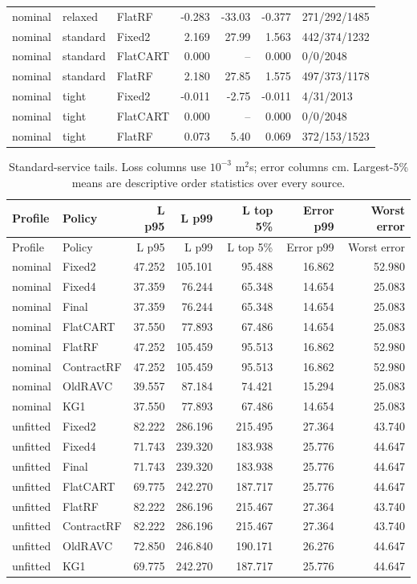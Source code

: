 \begin{longtable}{@{}lllrrrl@{}}
nominal & relaxed & FlatRF & -0.283 & -33.03 & -0.377 & 271/292/1485\\
nominal & standard & Fixed2 & 2.169 & 27.99 & 1.563 & 442/374/1232\\
nominal & standard & FlatCART & 0.000 & -- & 0.000 & 0/0/2048\\
nominal & standard & FlatRF & 2.180 & 27.85 & 1.575 & 497/373/1178\\
nominal & tight & Fixed2 & -0.011 & -2.75 & -0.011 & 4/31/2013\\
nominal & tight & FlatCART & 0.000 & -- & 0.000 & 0/0/2048\\
nominal & tight & FlatRF & 0.073 & 5.40 & 0.069 & 372/153/1523\\
\bottomrule\end{longtable}\normalsize
\small\begin{longtable}{@{}llrrrrr@{}}
\caption{Standard-service tails. Loss columns use $10^{-3}$ m$^2$s; error columns cm. Largest-5\% means are descriptive order statistics over every source.}\label{supp:tails}\\\toprule
Profile & Policy & L p95 & L p99 & L top 5\% & Error p99 & Worst error\\\midrule\endfirsthead
\toprule
Profile & Policy & L p95 & L p99 & L top 5\% & Error p99 & Worst error\\\midrule\endhead
nominal & Fixed2 & 47.252 & 105.101 & 95.488 & 16.862 & 52.980\\
nominal & Fixed4 & 37.359 & 76.244 & 65.348 & 14.654 & 25.083\\
nominal & Final & 37.359 & 76.244 & 65.348 & 14.654 & 25.083\\
nominal & FlatCART & 37.550 & 77.893 & 67.486 & 14.654 & 25.083\\
nominal & FlatRF & 47.252 & 105.459 & 95.513 & 16.862 & 52.980\\
nominal & ContractRF & 47.252 & 105.459 & 95.513 & 16.862 & 52.980\\
nominal & OldRAVC & 39.557 & 87.184 & 74.421 & 15.294 & 25.083\\
nominal & KG1 & 37.550 & 77.893 & 67.486 & 14.654 & 25.083\\
unfitted & Fixed2 & 82.222 & 286.196 & 215.495 & 27.364 & 43.740\\
unfitted & Fixed4 & 71.743 & 239.320 & 183.938 & 25.776 & 44.647\\
unfitted & Final & 71.743 & 239.320 & 183.938 & 25.776 & 44.647\\
unfitted & FlatCART & 69.775 & 242.270 & 187.717 & 25.776 & 44.647\\
unfitted & FlatRF & 82.222 & 286.196 & 215.467 & 27.364 & 43.740\\
unfitted & ContractRF & 82.222 & 286.196 & 215.467 & 27.364 & 43.740\\
unfitted & OldRAVC & 72.850 & 246.840 & 190.171 & 26.276 & 44.647\\
unfitted & KG1 & 69.775 & 242.270 & 187.717 & 25.776 & 44.647\\
\bottomrule\end{longtable}\normalsize
